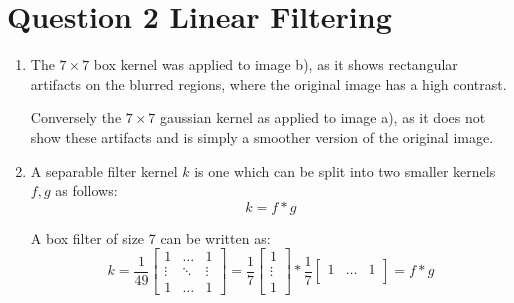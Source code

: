 \documentclass[12pt,letterpaper]{article}
\begin{document}
\section*{Question 2 Linear Filtering}
\begin{enumerate}[label=(\alph*)]
	\item The \( 7\times7 \) box kernel was applied to image b), as it shows 
	      rectangular artifacts on the blurred regions, where the original image has a high contrast.
	      
	      Conversely the \( 7\times7 \) gaussian kernel as applied to image a), as it does not show 
	      these artifacts and is simply a smoother version of the original image.
	      
	\item A separable filter kernel \( k \) is one which can be split into two smaller kernels \( f,g \) as follows:
	      \begin{equation}
	      	k = f * g
	      \end{equation}
	      
	      A box filter of size 7 can be written as:
	      \begin{equation}
	      	k = \frac{1}{49} \begin{bmatrix}
	      	1 & \hdots &1 \\
	      	\vdots & \ddots & \vdots \\
	      	1 & \hdots &1 
	      	\end{bmatrix}  
	      	=
	      	\frac{1}{7} \begin{bmatrix}
	      	1 \\
	      	\vdots \\
	      	1 
	      	\end{bmatrix}
	      	*
	      	\frac{1}{7} \begin{bmatrix}
	      	1 & \hdots & 1 \\
	      	\end{bmatrix}
	      	= f * g
	      \end{equation}
\end{enumerate}


\newpage
\end{document}
